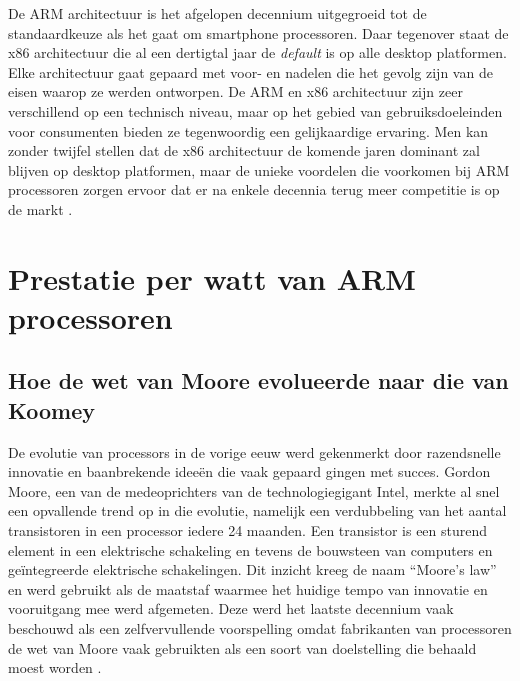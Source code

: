 De ARM architectuur is het afgelopen decennium uitgegroeid tot de standaardkeuze als het gaat om smartphone processoren. Daar tegenover staat de x86 architectuur die al een dertigtal jaar de \textit{default} is op alle desktop platformen. Elke architectuur gaat gepaard met voor- en nadelen die het gevolg zijn van de eisen waarop ze werden ontworpen. De ARM en x86 architectuur zijn zeer verschillend op een technisch niveau, maar op het gebied van gebruiksdoeleinden voor consumenten bieden ze tegenwoordig een gelijkaardige ervaring. Men kan zonder twijfel stellen dat de x86 architectuur de komende jaren dominant zal blijven op desktop platformen, maar de unieke voordelen die voorkomen bij ARM processoren zorgen ervoor dat er na enkele decennia terug meer competitie is op de markt \autocite{Triggs2022}.

\section{Prestatie per watt van ARM processoren}
\subsection{Hoe de wet van Moore evolueerde naar die van Koomey}
De evolutie van processors in de vorige eeuw werd gekenmerkt door razendsnelle innovatie en baanbrekende ideeën die vaak gepaard gingen met succes. Gordon Moore, een van de medeoprichters van de technologiegigant Intel, merkte al snel een opvallende trend op in die evolutie, namelijk een verdubbeling van het aantal transistoren in een processor iedere 24 maanden. Een transistor is een sturend element in een elektrische schakeling en tevens de bouwsteen van computers en geïntegreerde elektrische schakelingen. Dit inzicht kreeg de naam “Moore’s law” en werd gebruikt als de maatstaf waarmee het huidige tempo van innovatie en vooruitgang mee werd afgemeten. Deze werd het laatste decennium vaak beschouwd als een zelfvervullende voorspelling omdat fabrikanten van processoren de wet van Moore vaak gebruikten als een soort van doelstelling die behaald moest worden \autocite{Schaller1997}.

